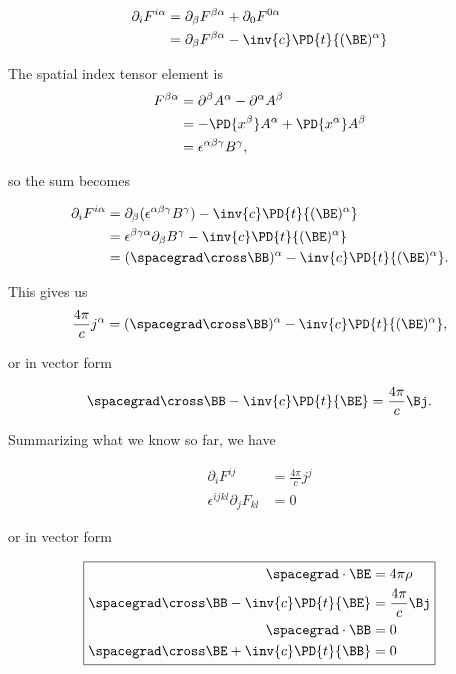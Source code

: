 \begin{align*}
\partial_i F^{i\alpha}
&= \partial_\beta F^{\beta \alpha} + \partial_0 F^{0 \alpha} \\
&= \partial_\beta F^{\beta \alpha} - \inv{c} \PD{t}{(\BE)^\alpha} \\
\end{align*}

The spatial index tensor element is
\begin{align*}
F^{\beta \alpha} 
&= 
\partial^\beta A^\alpha - \partial^\alpha A^\beta  \\
&= 
- \PD{x^\beta} A^\alpha + \PD{x^\alpha} A^\beta  \\
&= 
\epsilon^{\alpha\beta\gamma} B^\gamma,
\end{align*}

so the sum becomes

\begin{align*}
\partial_i F^{i\alpha}
&= \partial_\beta ( \epsilon^{\alpha\beta\gamma} B^\gamma) - \inv{c} \PD{t}{(\BE)^\alpha} \\
&= 
\epsilon^{\beta\gamma\alpha} \partial_\beta B^\gamma - \inv{c} \PD{t}{(\BE)^\alpha} \\
&= 
(\spacegrad \cross \BB)^\alpha - \inv{c} \PD{t}{(\BE)^\alpha}.
\end{align*}

This gives us
\begin{equation}\label{eqn:relativisticElectrodynamicsL13:350}
\frac{4 \pi}{c} j^\alpha
= (\spacegrad \cross \BB)^\alpha - \inv{c} \PD{t}{(\BE)^\alpha},
\end{equation}

or in vector form

\begin{equation}\label{eqn:relativisticElectrodynamicsL13:370}
\spacegrad \cross \BB - \inv{c} \PD{t}{\BE} = \frac{4 \pi}{c} \Bj.
\end{equation}

Summarizing what we know so far, we have

\begin{equation}\label{eqn:relativisticElectrodynamicsL13:390}
\boxed{
\begin{aligned}
\partial_i F^{ij} &= \frac{4 \pi}{c} j^j \\
\epsilon^{ijkl} \partial_j F_{kl} &= 0
\end{aligned}
}
\end{equation}

or in vector form

\begin{equation}\label{eqn:relativisticElectrodynamicsL13:410}
\boxed{
\begin{aligned}
\spacegrad \cdot \BE &= 4 \pi \rho \\
\spacegrad \cross \BB -\inv{c} \PD{t}{\BE} &= \frac{4 \pi}{c} \Bj \\
\spacegrad \cdot \BB &= 0 \\
\spacegrad \cross \BE +\inv{c} \PD{t}{\BB} &= 0
\end{aligned}
}
\end{equation}

